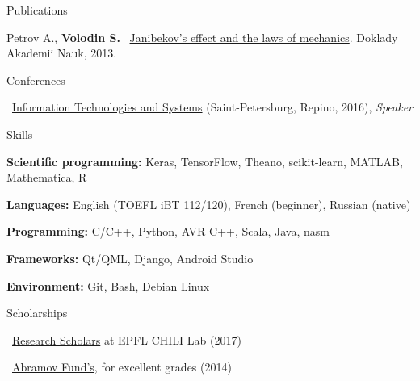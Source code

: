 \documentclass{resume} %
\begin{document}
\begin{rSection}{Publications}
\item Petrov A., {\bf Volodin S.} \faExternalLink~\href{https://link.springer.com/article/10.1134/S1028335813080041}{Janibekov's effect and the laws of mechanics}. Doklady Akademii Nauk, 2013.
\end{rSection}

\newpage

\begin{rSection}{Conferences}
\item \faExternalLink~\href{http://iitp.ru/en/conferences/itas}{Information Technologies and Systems} (Saint-Petersburg, Repino, 2016){, \em Speaker}
\end{rSection}

\begin{rSection}{Skills}
	\item {\bf Scientific programming:} Keras, TensorFlow, Theano, scikit-learn, MATLAB, Mathematica, R
	\item {\bf Languages:} English (TOEFL iBT 112/120), French (beginner), Russian (native)
	\item {\bf Programming:} C/C++, Python, AVR C++, Scala, Java, nasm
	\item {\bf Frameworks:} Qt/QML, Django, Android Studio
	\item {\bf Environment:} Git, Bash, Debian Linux
\end{rSection}

\begin{rSection}{Scholarships}
\item \faExternalLink~\href{https://ic.epfl.ch/ResearchScholars}{Research Scholars} at EPFL CHILI Lab (2017)
\item \faExternalLink~\href{http://phystech-foundation.org/}{Abramov Fund's}, for excellent grades (2014)
\end{rSection}
\end{document}
